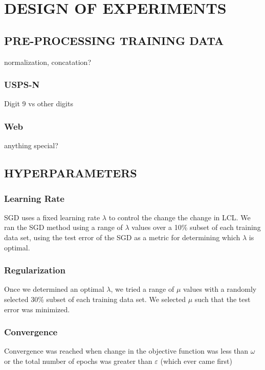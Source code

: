 \section{DESIGN OF EXPERIMENTS}
\label{sec:experiments}

\subsection{PRE-PROCESSING TRAINING DATA}
normalization, concatation?

\subsubsection{USPS-N}
Digit 9 vs other digits

\subsubsection{Web}
anything special?



\subsection{HYPERPARAMETERS}

\subsubsection{Learning Rate}
SGD uses a fixed learning rate $\lambda$ to control the change the change in LCL. We ran the SGD method using a range of $\lambda$ values over a 10\% subset of each training data set, using the test error of the SGD as a metric for determining which $\lambda$ is optimal.

\subsubsection{Regularization}
Once we determined an optimal $\lambda$, we tried a range of $\mu$ values with a randomly selected 30\% subset of each training data set. We selected $\mu$ such that the test error was minimized.

\subsubsection{Convergence}
Convergence was reached when change in the objective function was less than $\omega$ or the total number of epochs was greater than $\varepsilon$ (which ever came first)




